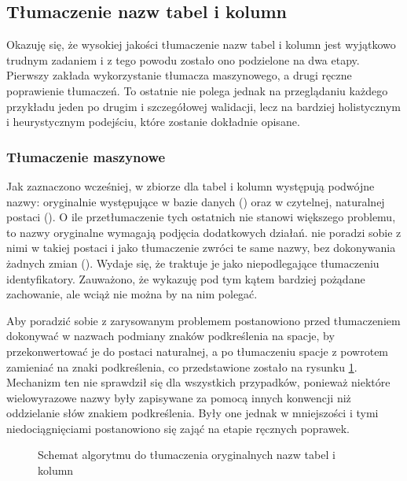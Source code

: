 \subsection{Tłumaczenie nazw tabel i kolumn}
\label{text:schema-translation}
Okazuję się, że wysokiej jakości tłumaczenie nazw tabel i kolumn jest wyjątkowo trudnym zadaniem i z tego powodu zostało ono podzielone na dwa etapy. Pierwszy zakłada wykorzystanie tłumacza maszynowego, a drugi ręczne poprawienie tłumaczeń. To ostatnie nie polega jednak na przeglądaniu każdego przykładu jeden po drugim i szczegółowej walidacji, lecz na bardziej holistycznym i heurystycznym podejściu, które zostanie dokładnie opisane.


\subsubsection{Tłumaczenie maszynowe}
Jak zaznaczono wcześniej, w zbiorze  dla tabel i kolumn występują podwójne nazwy: oryginalnie występujące w bazie danych () oraz w czytelnej, naturalnej postaci (). O ile przetłumaczenie tych ostatnich nie stanowi większego problemu, to nazwy oryginalne wymagają podjęcia dodatkowych działań.  nie poradzi sobie z nimi w takiej postaci i jako tłumaczenie zwróci te same nazwy, bez dokonywania żadnych zmian (\mbox{}). Wydaje się, że traktuje je jako niepodlegające tłumaczeniu identyfikatory. Zauważono, że  wykazuję pod tym kątem bardziej pożądane zachowanie, ale wciąż nie można by na nim polegać. 

Aby poradzić sobie z zarysowanym problemem postanowiono przed tłumaczeniem dokonywać w nazwach podmiany znaków podkreślenia na spacje, by przekonwertować je do postaci naturalnej, a po tłumaczeniu spacje z powrotem zamieniać na znaki podkreślenia, co przedstawione zostało na rysunku \ref{fig:multi-word-translation}. Mechanizm ten nie sprawdził się dla wszystkich przypadków, ponieważ niektóre wielowyrazowe nazwy były zapisywane za pomocą innych konwencji niż oddzielanie słów znakiem podkreślenia. Były one jednak w mniejszości i tymi niedociągnięciami postanowiono się zająć na etapie ręcznych poprawek.

\begin{figure}[ht!]
  \centering
  
  \caption{Schemat algorytmu do tłumaczenia oryginalnych nazw tabel i kolumn}
  \label{fig:multi-word-translation}
\end{figure}

